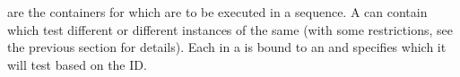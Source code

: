 \label{ConceptsTestJob}

\gdjobs{} are the containers for \gdsuites{} which are to be executed in a sequence. A \gdjob{} can contain \gdsuites{} which test different \gdauts{} or different instances of the same \gdaut{} (with some restrictions, see the previous section  for details). Each \gdsuite{} in a \gdjob{} is bound to an \gdaut{} and specifies which \gdaut{} it will test based on the \gdaut{} ID. 


